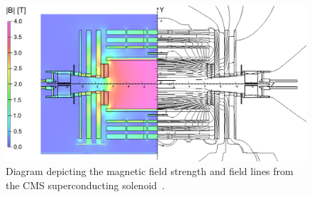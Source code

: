 \begin{figure}[htb]
\centering
  \includegraphics[width=0.9\linewidth]{plots/CMS/magnetic_field.png}
  \caption{Diagram depicting the magnetic field strength and field lines from the CMS superconducting solenoid~\cite{Chatrchyan:2009si}.}
  \label{fig:cms:bfield}
\end{figure}